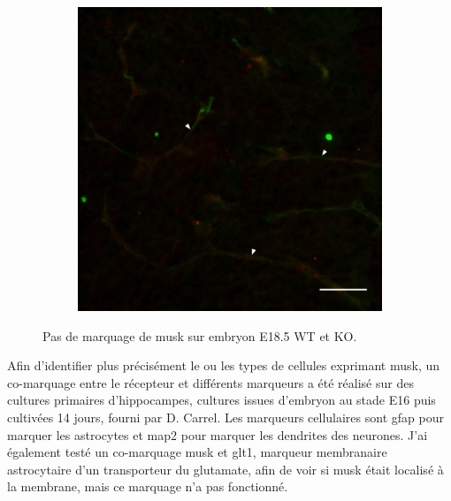 \begin{figure}[h]
\begin{center}
\begin{subfigure}[h]{0.329\textwidth}
			\end{subfigure}
			\begin{subfigure}[h]{0.329\textwidth}
				\caption{}
				\label{fig:MuskE1KO}
				\includegraphics[width=\textwidth]{./Images/Immuno/Musk/Embryon/E1KO_50um_500px_df.jpg}
			\end{subfigure}
		\end{center}
		\caption{Pas de marquage de \gls{musk} sur embryon E18.5 WT et KO.}
		\label{fig:MuskEmbryon}
	\end{figure}
\FloatBarrier

	Afin d'identifier plus précisément le ou les types de cellules exprimant \gls{musk}, un co-marquage entre le récepteur et différents marqueurs a été réalisé sur des cultures primaires d'hippocampes, cultures issues d'embryon au stade E16 puis cultivées 14 jours, fourni par D. Carrel. Les marqueurs cellulaires sont \gls{gfap} pour marquer les astrocytes et \gls{map2} pour marquer les dendrites des neurones. J'ai également testé un co-marquage \gls{musk} et \gls{glt1}, marqueur membranaire astrocytaire d'un transporteur du glutamate, afin de voir si \gls{musk} était localisé à la membrane, mais ce marquage n'a pas fonctionné.
	
